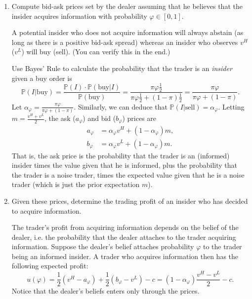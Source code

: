 \documentclass[11pt
]{exam}
\begin{document}
\begin{enumerate} [label=(\alph*). ]

\item Compute bid-ask prices set by the dealer assuming that he believes that the insider acquires information with probability $\varphi \in [0,1]$.

\begin{solution}
A potential insider who does not acquire information will always abstain (as long as there is a positive bid-ask spread) whereas an insider who observes $v^H$ ($v^L$) will buy (sell). (You can verify this in the end.)

Use Bayes' Rule to calculate the probability that the trader is an \textit{insider} given a buy order is
\[
\mathbb{P}(I|\text{buy}) = \frac{\mathbb{P}(I) \cdot \mathbb{P}(\text{buy}|I)}{\mathbb{P}(\text{buy})} =\frac{\pi \varphi \frac{1}{2}}{\pi \varphi \frac{1}{2} + (1-\pi)\frac{1}{2}} = \frac{\pi \varphi }{\pi \varphi  + (1-\pi)}.
\]
Let $\alpha_\varphi = \frac{\pi \varphi }{\pi \varphi  + (1-\pi)}$. Similarly, we can deduce that $\mathbb{P}(I|\text{sell})=\alpha_\varphi$. Letting $m=\frac{v^H+v^L}{2}$, the ask ($a_\varphi$) and bid ($b_\varphi$) prices are
\begin{align*}
a_\varphi & = \alpha_\varphi v^H+(1-\alpha_\varphi) m, \\
b_\varphi & = \alpha_\varphi v^L+(1-\alpha_\varphi) m.
\end{align*}
That is, the ask price is the probability that the trader is an (informed) insider times the value given that he is informed, plus the probability that the trader is a noise trader, times the expected value  given that he is a noise trader (which is just the prior expectation $m$).
\end{solution}

\item Given these prices, determine the trading profit of an insider who has decided to acquire information.

\begin{solution}
The trader's profit from acquiring information depends on the belief of the dealer, i.e. the probability that the dealer attaches to the trader acquiring information. Suppose the dealer's belief attaches probability $\varphi$ to the trader being an informed insider. A trader who acquires information then has the following expected profit:
\[
u(\varphi) = \frac{1}{2}(v^H - a_\varphi) + \frac{1}{2}(b_\varphi - v^L) - c = (1-\alpha_\varphi) \frac{v^H-v^L}{2}-c.
\]
Notice that the dealer's beliefs enters only through the prices.
\end{solution}


\end{enumerate}
\end{document}
